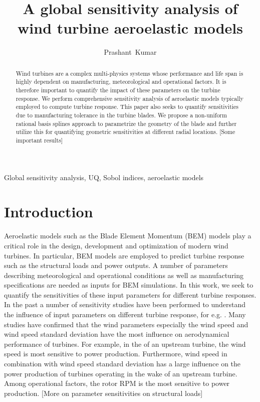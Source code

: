 \documentclass[review]{elsarticle}
\title{A global sensitivity analysis of wind turbine aeroelastic models}
\numberwithin{equation}{section}
\numberwithin{equation}{section}
\begin{document}
\begin{frontmatter}
\author[]{Prashant~Kumar}
\begin{abstract}
Wind turbines are a complex multi-physics systems whose performance and life span is highly dependent on manufacturing, meteorological and operational factors. It is therefore important to quantify the impact of these parameters on the turbine response. We perform comprehensive sensitivity analysis of aeroelastic models typically employed to compute turbine response. This paper also seeks to quantify sensitivities due to manufacturing tolerance in the turbine blades. We propose a non-uniform rational basis splines approach to parametrize the geometry of the blade and further utilize this for quantifying geometric sensitivities at different radial locations. [Some important results]
\end{abstract}
\begin{keyword}
Global sensitivity analysis, UQ, Sobol indices, aeroelastic models
\end{keyword}
\end{frontmatter}
\linenumbers
\section{Introduction}
Aeroelastic models such as the Blade Element Momentum (BEM) models \cite{HandBook} play a critical role in the design, development and optimization of modern wind turbines. In particular, BEM models are employed to predict turbine response such as the structural loads and power outputs. A number of parameters describing meteorological and operational conditions as well as manufacturing specifications are needed as inputs for BEM simulations. In this work, we seek to quantify the sensitivities of these input parameters for different turbine responses. In the past a number of sensitivity studies have been performed to understand the influence of input parameters on different turbine response, for e.g. \cite{moriarty2002effect, eggers2003wind, McKay2014, dykes2014sensitivity, Robertson2018}. Many studies have confirmed that the wind parameters especially the wind speed and wind speed standard deviation have the most influence on aerodynamical performance of turbines. For example, in the of an upstream turbine, the wind speed is most sensitive to power production. Furthermore, wind speed in combination with wind speed standard deviation has a large influence on the power production of turbines operating in the wake of an upstream turbine. Among operational factors, the rotor RPM is the most sensitive to power production. [More on parameter sensitivities on structural loads]
\end{document}
